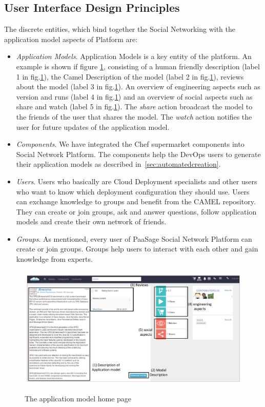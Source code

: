 \subsection{User Interface Design Principles}
The discrete entities, which bind together the Social Networking with the application model aspects of Platform are:
\begin{itemize}
\item \emph{Application Models}. Application Models is a key entity of the platform. An example is shown if figure \ref{fig:jenter_home}, consisting of a human friendly description (label 1 in fig.\ref{fig:jenter_home}), the Camel Description of the model (label 2 in fig.\ref{fig:jenter_home}), reviews about the model (label 3 in fig.\ref{fig:jenter_home}). An overview of engineering aspects such as version and runs (label 4 in fig.\ref{fig:jenter_home}) and an overview of social aspects such as share and watch (label 5 in fig.\ref{fig:jenter_home}). The {\it share} action broadcast the model to the friends of the user that shares the model. The {\it watch} action notifies the user for future updates of the application model. 
\item \emph{Components}. We have integrated the Chef supermarket components into Social Network Platform. The components help the DevOps users to generate their application models as described in~\ref{sec:automatedcreation}. 
\item \emph{Users}. Users who basically are Cloud Deployment specialists and other users who want to know which deployment configuration they should use. Users can exchange knowledge to groups and benefit from the CAMEL repository. They can create or join groups, ask and answer questions, follow application models and create their own network of friends.
\item \emph{Groups}. As mentioned, every user of PaaSage Social Network Platform can create or join groups. Groups help users to interact with each other and gain knowledge from experts.
\end{itemize}

\begin{figure}[h]
	\caption{The application model home page}
	\includegraphics[width=1\textwidth,natwidth=200,natheight=150]{./fig/jenterprise_home_page.pdf}
	\centering
	\label{fig:jenter_home}
\end{figure}

